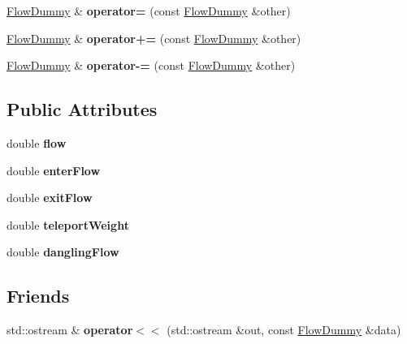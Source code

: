 \begin{DoxyCompactItemize}
\mbox{\hyperlink{structFlowDummy}{Flow\+Dummy}} \& {\bfseries operator=} (const \mbox{\hyperlink{structFlowDummy}{Flow\+Dummy}} \&other)
\item 
\mbox{\label{structFlowDummy_a6ce5e6ea5b7bdd230f2e89b18680f43e}} 
\mbox{\hyperlink{structFlowDummy}{Flow\+Dummy}} \& {\bfseries operator+=} (const \mbox{\hyperlink{structFlowDummy}{Flow\+Dummy}} \&other)
\item 
\mbox{\label{structFlowDummy_a9c7145390aaf9415a3f6d02db0b8da28}} 
\mbox{\hyperlink{structFlowDummy}{Flow\+Dummy}} \& {\bfseries operator-\/=} (const \mbox{\hyperlink{structFlowDummy}{Flow\+Dummy}} \&other)
\end{DoxyCompactItemize}
\subsection*{Public Attributes}
\begin{DoxyCompactItemize}
\item 
\mbox{\label{structFlowDummy_ab256f253485b0bf5a618c78aa8f6de8b}} 
double {\bfseries flow}
\item 
\mbox{\label{structFlowDummy_aaf7e035838d74bf853bcb359e35392d6}} 
double {\bfseries enter\+Flow}
\item 
\mbox{\label{structFlowDummy_a053749fda77b6a0ec64daee9f1596ced}} 
double {\bfseries exit\+Flow}
\item 
\mbox{\label{structFlowDummy_ac34d62619de4c3d76dd7238b6ae7cb1a}} 
double {\bfseries teleport\+Weight}
\item 
\mbox{\label{structFlowDummy_acf6460b4473134c19c0bae5b6f611554}} 
double {\bfseries dangling\+Flow}
\end{DoxyCompactItemize}
\subsection*{Friends}
\begin{DoxyCompactItemize}
\item 
\mbox{\label{structFlowDummy_ae492f0c61773bc5ff60cfcc673d0aade}} 
std\+::ostream \& {\bfseries operator$<$$<$} (std\+::ostream \&out, const \mbox{\hyperlink{structFlowDummy}{Flow\+Dummy}} \&data)
\end{DoxyCompactItemize}


